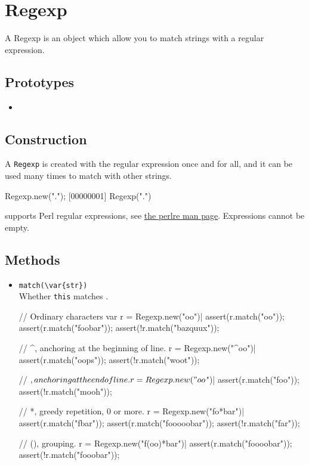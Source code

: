 \section{Regexp}

A Regexp is an object which allow you to match strings with a regular
expression.

\subsection{Prototypes}
\begin{itemize}
\item {}
\end{itemize}

\subsection{Construction}
\label{stdlib:tag:ctor}

A \lstinline{Regexp} is created with the regular expression once and
for all, and it can be used many times to match with other strings.

\begin{urbiscript}
Regexp.new(".");
[00000001] Regexp(".")
\end{urbiscript}

\us supports Perl regular expressions, see
\href{http://perldoc.perl.org/perlre.html}{the perlre man page}.
Expressions cannot be empty.

\subsection{Methods}
\begin{itemize}
\item \lstinline|match(\var{str})|\\
  Whether \lstinline|this| matches .
\begin{urbiscript}[firstnumber=last]
// Ordinary characters
var r = Regexp.new("oo")|
assert(r.match("oo"));
assert(r.match("foobar"));
assert(!r.match("bazquux"));

// ^, anchoring at the beginning of line.
r = Regexp.new("^oo")|
assert(r.match("oops"));
assert(!r.match("woot"));

// $, anchoring at the end of line.
r = Regexp.new("oo$")|
assert(r.match("foo"));
assert(!r.match("mooh"));

// *, greedy repetition, 0 or more.
r = Regexp.new("fo*bar")|
assert(r.match("fbar"));
assert(r.match("fooooobar"));
assert(!r.match("far"));

// (), grouping.
r = Regexp.new("f(oo)*bar")|
assert(r.match("foooobar"));
assert(!r.match("fooobar"));
\end{urbiscript}

\end{itemize}

